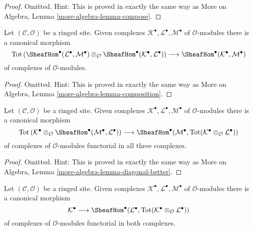 \begin{proof}
Omitted. Hint: This is proved in exactly the same way as
More on Algebra, Lemma \ref{more-algebra-lemma-compose}.
\end{proof}

\begin{lemma}
\label{lemma-composition}
Let $(\mathcal{C}, \mathcal{O})$ be a ringed site. Given complexes
$\mathcal{K}^\bullet, \mathcal{L}^\bullet, \mathcal{M}^\bullet$
of $\mathcal{O}$-modules there is a canonical morphism
$$
\text{Tot}\left(
\SheafHom^\bullet(\mathcal{L}^\bullet, \mathcal{M}^\bullet)
\otimes_\mathcal{O}
\SheafHom^\bullet(\mathcal{K}^\bullet, \mathcal{L}^\bullet)
\right)
\longrightarrow
\SheafHom^\bullet(\mathcal{K}^\bullet, \mathcal{M}^\bullet)
$$
of complexes of $\mathcal{O}$-modules.
\end{lemma}

\begin{proof}
Omitted. Hint: This is proved in exactly the same way as
More on Algebra, Lemma \ref{more-algebra-lemma-composition}.
\end{proof}

\begin{lemma}
\label{lemma-diagonal-better}
Let $(\mathcal{C}, \mathcal{O})$ be a ringed site. Given complexes
$\mathcal{K}^\bullet, \mathcal{L}^\bullet, \mathcal{M}^\bullet$
of $\mathcal{O}$-modules there is a canonical morphism
$$
\text{Tot}\left(
\mathcal{K}^\bullet \otimes_\mathcal{O}
\SheafHom^\bullet(\mathcal{M}^\bullet, \mathcal{L}^\bullet)
\right)
\longrightarrow
\SheafHom^\bullet(\mathcal{M}^\bullet,
\text{Tot}(\mathcal{K}^\bullet \otimes_\mathcal{O} \mathcal{L}^\bullet))
$$
of complexes of $\mathcal{O}$-modules functorial in all three complexes.
\end{lemma}

\begin{proof}
Omitted. Hint: This is proved in exactly the same way as
More on Algebra, Lemma \ref{more-algebra-lemma-diagonal-better}.
\end{proof}

\begin{lemma}
\label{lemma-diagonal}
Let $(\mathcal{C}, \mathcal{O})$ be a ringed site. Given complexes
$\mathcal{K}^\bullet, \mathcal{L}^\bullet, \mathcal{M}^\bullet$
of $\mathcal{O}$-modules there is a canonical morphism
$$
\mathcal{K}^\bullet
\longrightarrow
\SheafHom^\bullet(\mathcal{L}^\bullet,
\text{Tot}(\mathcal{K}^\bullet \otimes_\mathcal{O} \mathcal{L}^\bullet))
$$
of complexes of $\mathcal{O}$-modules functorial in both complexes.
\end{lemma}


